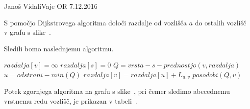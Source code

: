 \begin{naloga}{Janoš Vidali}{Vaje OR 7.12.2016}
\begin{vprasanje}
S pomočjo Dijkstrovega algoritma
določi razdalje od vozlišča $a$ do ostalih vozlišč
v grafu s slike~\fig.

\begin{slika}
\pgfslika
{}
\end{slika}
\end{vprasanje}


\begin{odgovor}
Sledili bomo naslednjemu algoritmu.
\begin{small}
\begin{algorithmic}
		\State $razdalja[v] = \infty$
	\EndFor
	\State $razdalja[s] = 0$
	\State $Q = vrsta-s-prednostjo(v, razdalja)$
		\State$ u = odstrani-min(Q)$
				\State$ razdalja[v] = razdalja[u] +  L_{u, v}$
				\State $posodobi(Q, v)$
			\EndIf
		\EndFor
	\EndWhile
\EndFunction
\end{algorithmic}
\end{small}
%
Potek zgornjega algoritma na grafu s slike~\fig,
pri čemer sledimo abecednemu vrstnemu redu vozlišč,
je prikazan v tabeli~\tab.



\end{odgovor}
\end{naloga}
